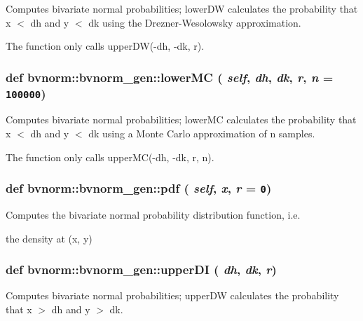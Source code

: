 Computes bivariate normal probabilities; lowerDW calculates the probability that x $<$ dh and y $<$ dk using the Drezner-Wesolowsky approximation. 

The function only calls upperDW(-dh, -dk, r). \hypertarget{classbvnorm_1_1bvnorm__gen_86b9c8b6b258da3a7eb66cd91b00416b}{
\subsubsection[{lowerMC}]{\setlength{\rightskip}{0pt plus 5cm}def bvnorm::bvnorm\_\-gen::lowerMC ( {\em self}, \/   {\em dh}, \/   {\em dk}, \/   {\em r}, \/   {\em n} = {\tt 100000})}}
\label{classbvnorm_1_1bvnorm__gen_86b9c8b6b258da3a7eb66cd91b00416b}


Computes bivariate normal probabilities; lowerMC calculates the probability that x $<$ dh and y $<$ dk using a Monte Carlo approximation of n samples. 

The function only calls upperMC(-dh, -dk, r, n). \hypertarget{classbvnorm_1_1bvnorm__gen_e259683554c1efa1017f733f0824a38a}{
\subsubsection[{pdf}]{\setlength{\rightskip}{0pt plus 5cm}def bvnorm::bvnorm\_\-gen::pdf ( {\em self}, \/   {\em x}, \/   {\em r} = {\tt 0})}}
\label{classbvnorm_1_1bvnorm__gen_e259683554c1efa1017f733f0824a38a}


Computes the bivariate normal probability distribution function, i.e. 

the density at (x, y) \hypertarget{classbvnorm_1_1bvnorm__gen_a21b04c4ce48d3215ead047576149238}{
\subsubsection[{upperDI}]{\setlength{\rightskip}{0pt plus 5cm}def bvnorm::bvnorm\_\-gen::upperDI ( {\em dh}, \/   {\em dk}, \/   {\em r})}}
\label{classbvnorm_1_1bvnorm__gen_a21b04c4ce48d3215ead047576149238}


Computes bivariate normal probabilities; upperDW calculates the probability that x $>$ dh and y $>$ dk. 

